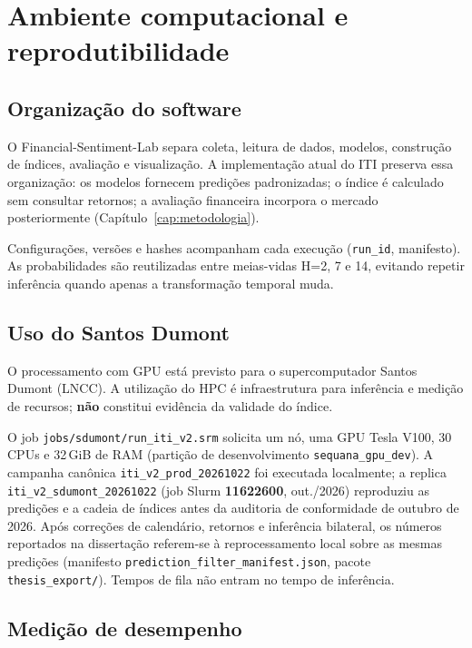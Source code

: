 \chapter{Ambiente computacional e reprodutibilidade}
\label{cap:ambiente}

\section{Organização do software}

O Financial-Sentiment-Lab separa coleta, leitura de dados, modelos, construção de índices, avaliação e visualização. A implementação atual do ITI preserva essa organização: os modelos fornecem predições padronizadas; o índice é calculado sem consultar retornos; a avaliação financeira incorpora o mercado posteriormente (Capítulo~\ref{cap:metodologia}).

Configurações, versões e hashes acompanham cada execução (\texttt{run\_id}, manifesto). As probabilidades são reutilizadas entre meias-vidas H=2, 7 e 14, evitando repetir inferência quando apenas a transformação temporal muda.

\section{Uso do Santos Dumont}

O processamento com GPU está previsto para o supercomputador Santos Dumont (LNCC). A utilização do HPC é infraestrutura para inferência e medição de recursos; \textbf{não} constitui evidência da validade do índice.

O job \texttt{jobs/sdumont/run\_iti\_v2.srm} solicita um nó, uma GPU Tesla V100, 30 CPUs e 32\,GiB de RAM (partição de desenvolvimento \texttt{sequana\_gpu\_dev}). A campanha canônica \texttt{iti\_v2\_prod\_20261022} foi executada localmente; a replica \texttt{iti\_v2\_sdumont\_20261022} (job Slurm \textbf{11622600}, out./2026) reproduziu as predições e a cadeia de índices antes da auditoria de conformidade de outubro de 2026. Após correções de calendário, retornos e inferência bilateral, os números reportados na dissertação referem-se à reprocessamento local sobre as mesmas predições (manifesto \texttt{prediction\_filter\_manifest.json}, pacote \texttt{thesis\_export/}). Tempos de fila não entram no tempo de inferência.

\section{Medição de desempenho}

